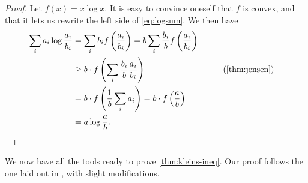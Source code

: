 \begin{proof}
  Let $f(x)=x\log x$. It is easy to convince oneself that $f$ is convex, and
  that it lets us rewrite the left side of \cref{eq:logsum}. We then have
  \begin{alignat*}{2}
    \sum_i a_i \log \frac{a_i}{b_i}
      &=\sum_i b_i f\left( \frac{a_i}{b_i} \right) 
      =b\sum_i \frac{b_i}{b} f\left( \frac{a_i}{b_i} \right) \\
      &\geq b\cdot f\left( \sum_i \frac{b_i}{b}\frac{a_i}{b_i} \right)
      &&\qquad{\text{(\cref{thm:jensen})}}\\
      &= b\cdot f\left( \frac{1}{b}\sum_i a_i \right)
      = b\cdot f\left( \frac{a}{b}\right) \\
      &= a \log \frac{a}{b}
  .\end{alignat*}
\end{proof}
We now have all the tools ready to prove \cref{thm:kleins-ineq}. Our proof
follows the one laid out in \cite{nielsenQuantumComputationQuantum2010}, with
slight modifications.
